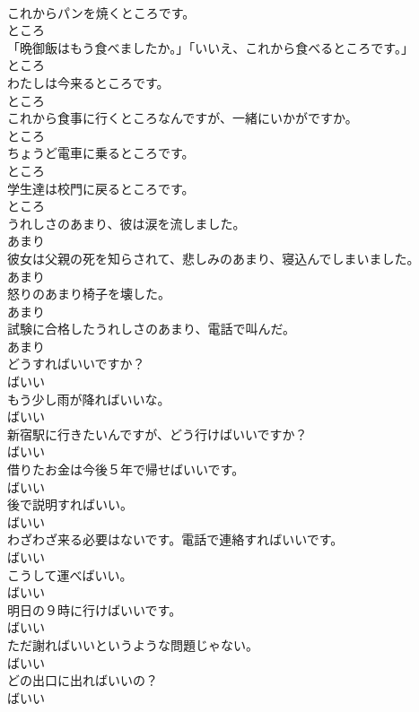 \documentclass[8pt]{extreport}
\begin{document}
\begin{CJK}{UTF8}{min}
\\	これからパンを焼くところです。	
\\	ところ
\\	「晩御飯はもう食べましたか。」「いいえ、これから食べるところです。」	
\\	ところ
\\	わたしは今来るところです。	
\\	ところ
\\	これから食事に行くところなんですが、一緒にいかがですか。	
\\	ところ
\\	ちょうど電車に乗るところです。	
\\	ところ
\\	学生達は校門に戻るところです。	
\\	ところ
\\	うれしさのあまり、彼は涙を流しました。	
\\	あまり
\\	彼女は父親の死を知らされて、悲しみのあまり、寝込んでしまいました。	
\\	あまり
\\	怒りのあまり椅子を壊した。	
\\	あまり
\\	試験に合格したうれしさのあまり、電話で叫んだ。	
\\	あまり
\\	どうすればいいですか？	
\\	ばいい
\\	もう少し雨が降ればいいな。	
\\	ばいい
\\	新宿駅に行きたいんですが、どう行けばいいですか？	
\\	ばいい
\\	借りたお金は今後５年で帰せばいいです。	
\\	ばいい
\\	後で説明すればいい。	
\\	ばいい
\\	わざわざ来る必要はないです。電話で連絡すればいいです。	
\\	ばいい
\\	こうして運べばいい。	
\\	ばいい
\\	明日の９時に行けばいいです。	
\\	ばいい
\\	ただ謝ればいいというような問題じゃない。	
\\	ばいい
\\	どの出口に出ればいいの？	
\\	ばいい

\end{CJK}
\end{document}
